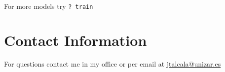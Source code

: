 \documentclass[fleqn, letter, 10pt]{article}
\begin{document}
For more models try \verb|? train|



\section{Contact Information}

For questions contact me in my office or per email 
at \url{jtalcala@unizar.es}


%
%
%
%
\end{document}
